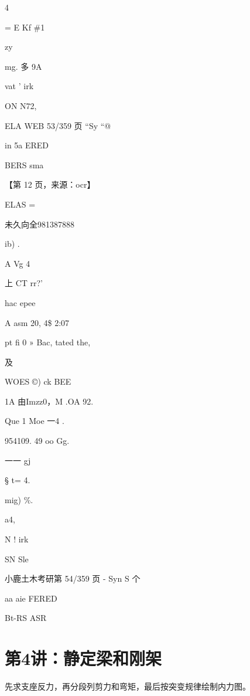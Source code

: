 \documentclass[UTF8,12pt,a4paper,openany]{ctexbook}
\begin{document}
\begin{enumerate}[label=\textbf{\arabic*.},leftmargin=2em]
                    4\par =              E               Kf \#1\par zy\par mg.                               多 9A\par vat ' irk\par ON N72,\par ELA WEB 53/359 页                            “Sy “@\par in 5a ERED\par BERS sma\par \par 【第 12 页，来源：ocr】\par ELAS       =\par 未久向全981387888\par ib)        .\par A        Vg       4\par 上 CT rr?’\par hac epee\par A             asm 20, 4\$  2:07\par pt     fi 0 » Bac, tated the,\par 及\par WOES ©) ck BEE\par 1A                    由Imzz0，M .OA 92.\par Que               1 Moe 一4 .\par 954109. 49 oo Gg.\par 一一     gj\par § t= 4.\par mig)                     \%.\par a4,\par N ! irk\par SN Sle\par 小鹿土木考研第 54/359 页                              - Syn S 个\par aa aie FERED\par Bt-RS ASR
\end{enumerate}
\chapter{第4讲：静定梁和刚架}
\begin{tcolorbox}[title=解析总览]
先求支座反力，再分段列剪力和弯矩，最后按突变规律绘制内力图。
\end{tcolorbox}
\end{document}

